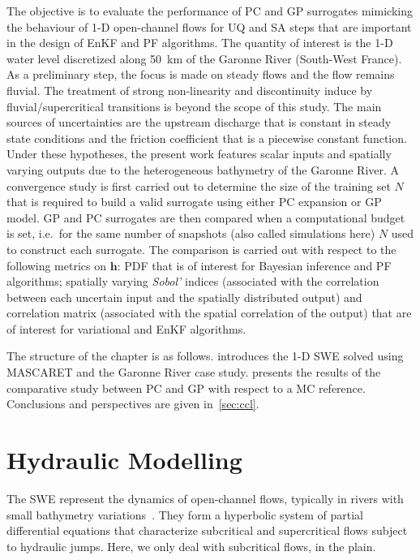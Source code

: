 The objective is to evaluate the performance of PC and GP surrogates mimicking the behaviour of 1-D open-channel flows for UQ and SA steps that are important in the design of EnKF and PF algorithms. The quantity of interest is the 1-D water level discretized along 50~km of the Garonne River (South-West France). As a preliminary step, the focus is made on steady flows and the flow remains fluvial. The treatment of strong non-linearity and discontinuity induce by fluvial/supercritical transitions is beyond the scope of this study. The main sources of uncertainties are the upstream discharge that is constant in steady state conditions and the friction coefficient that is a piecewise constant function. Under these hypotheses, the present work features scalar inputs and spatially varying outputs due to the heterogeneous bathymetry of the Garonne River. A convergence study is first carried out to determine the size of the training set $N$ that is required to build a valid surrogate using either PC expansion or GP model. GP and PC surrogates are then compared when a computational budget is set, i.e.~for the same number of snapshots (also called simulations here) $N$ used to construct each surrogate. The comparison is carried out with respect to the following metrics on $\mathbf{h}$: PDF that is of interest for Bayesian inference and PF algorithms; spatially varying \emph{Sobol'} indices (associated with the correlation between each uncertain input and the spatially distributed output) and correlation matrix (associated with the spatial correlation of the output) that are of interest for variational and EnKF algorithms.

The structure of the chapter is as follows.  introduces the 1-D SWE solved using MASCARET and the Garonne River case study.  presents the results of the comparative study between PC and GP with respect to a MC reference. Conclusions and perspectives are given in~\cref{sec:ccl}.

\section{Hydraulic Modelling}\label{sec:hydrau}

The SWE represent the dynamics of open-channel flows, typically in rivers with small bathymetry variations~\citep{horritt2002}. They form a hyperbolic system of partial differential equations that characterize subcritical and supercritical flows subject to hydraulic jumps. Here, we only deal with subcritical flows, in the plain.

